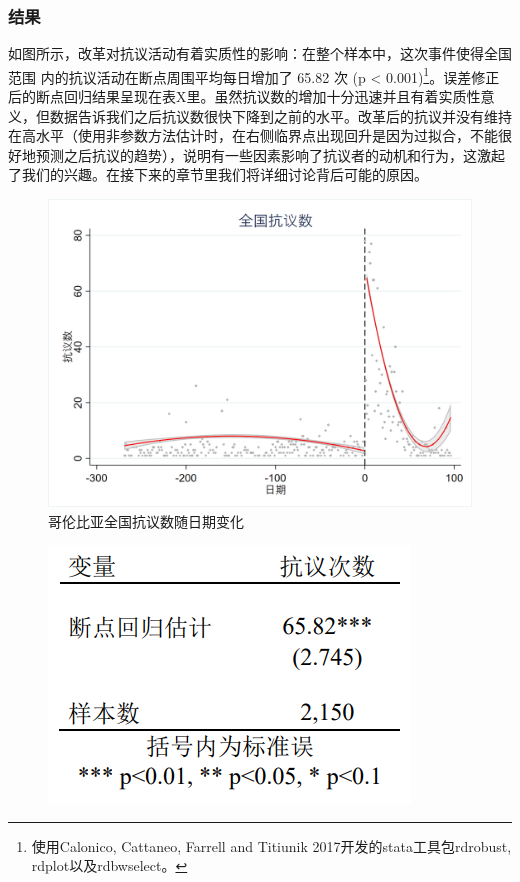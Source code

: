 \documentclass{phyasgn}\usepackage{nag}
\begin{document}
\subsubsection{结果}
如图所示，改革对抗议活动有着实质性的影响：在整个样本中，这次事件使得全国范围 内的抗议活动在断点周围平均每日增加了 65.82 次 (p < 0.001)\footnote[13]{使用Calonico, Cattaneo, Farrell and Titiunik 2017开发的stata工具包rdrobust, rdplot以及rdbwselect。}。误差修正后的断点回归结果呈现在表X里。虽然抗议数的增加十分迅速并且有着实质性意义，但数据告诉我们之后抗议数很快下降到之前的水平。改革后的抗议并没有维持在高水平（使用非参数方法估计时，在右侧临界点出现回升是因为过拟合，不能很好地预测之后抗议的趋势），说明有一些因素影响了抗议者的动机和行为，这激起了我们的兴趣。在接下来的章节里我们将详细讨论背后可能的原因。
\begin{figure}[!h]
                    	\centering
                    	\includegraphics[width=.9\linewidth]{pic/9.png}
                    	\caption{哥伦比亚全国抗议数随日期变化}
                    	\label{fig:9}
                    	\end{figure}
\begin{figure}[!h]
                    	\centering
                    	\includegraphics[width=.6\linewidth]{pic/10.png}
                    	\end{figure}
\end{document}

